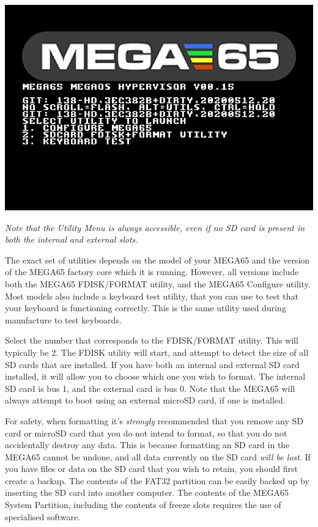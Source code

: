 \includegraphics[width=\linewidth]{images/ss-utilmenu.png}

{\em Note that the Utility Menu is always accessible, even if no SD card is present in both the internal and external slots.}

The exact set of utilities
depends on the model of your MEGA65 and the version of the MEGA65
factory core which it is running. However, all versions include both
the MEGA65 FDISK/FORMAT utility, and the MEGA65 Configure utility.
Most models also include a keyboard test utility, that you can use
to test that your keyboard is functioning correctly.  This is
the same utility used during manufacture to test keyboards.

Select the number that corresponds to the FDISK/FORMAT utility.  This
will typically be 2.  The FDISK utility will start, and attempt to
detect the size of all SD cards that are installed.  If you have both
an internal and external SD card installed, it will allow you to
choose which one you wish to format. The internal SD card is bus 1,
and the external card is bus 0.  Note that the MEGA65 will
always attempt to boot using an external microSD card, if one is
installed.

For safety, when formatting it's {\em strongly} recommended
that you remove any SD card or microSD card that you do not intend to
format, so that you do not accidentally destroy any data.  This is
because formatting an SD card in the MEGA65 cannot be undone, and
all data currently on the SD card {\em will be lost}.  If you
have files or data on the SD card that you wish to retain, you
should first create a backup.  The contents of the FAT32
partition can be easily backed up by inserting the SD card into
another computer.  The contents of the MEGA65 System Partition,
including the contents of freeze slots requires the use of specialised
software.

